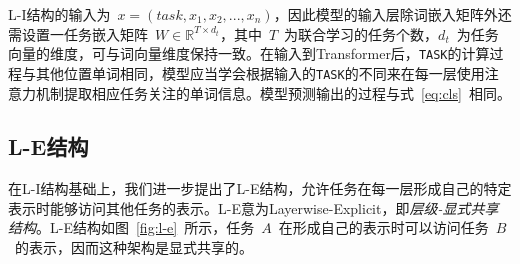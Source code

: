 L-I结构的输入为~$x=(task, x_1, x_2, ..., x_n)$，因此模型的输入层除词嵌入矩阵外还需设置一任务嵌入矩阵~$W\in \mathbb{R}^{T\times d_{t}}$，其中~$T$~为联合学习的任务个数，$d_{t}$~为任务向量的维度，可与词向量维度保持一致。在输入到Transformer后，\texttt{TASK}的计算过程与其他位置单词相同，模型应当学会根据输入的\texttt{TASK}的不同来在每一层使用注意力机制提取相应任务关注的单词信息。模型预测输出的过程与式~\ref{eq:cls}~相同。

\subsection{L-E结构}
在L-I结构基础上，我们进一步提出了L-E结构，允许任务在每一层形成自己的特定表示时能够访问其他任务的表示。L-E意为Layerwise-Explicit，即\emph{层级-显式共享结构}。L-E结构如图~\ref{fig:l-e}~所示，任务~$A$~在形成自己的表示时可以访问任务~$B$~的表示，因而这种架构是显式共享的。

